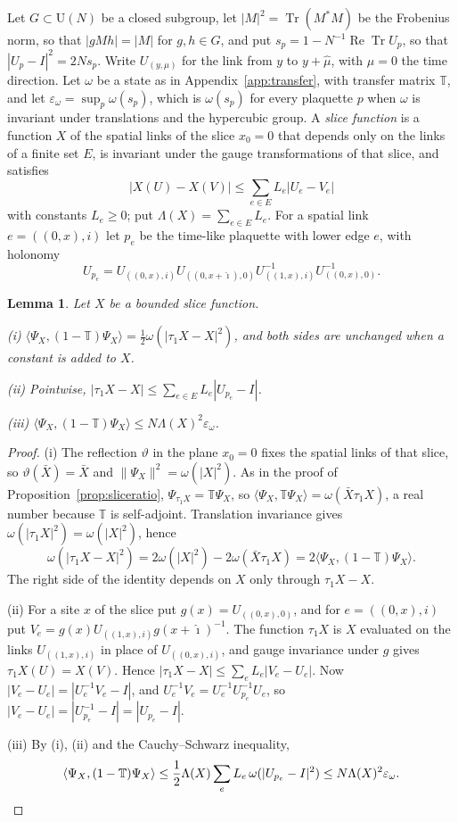 \documentclass[aps,prd,twocolumn,superscriptaddress,nofootinbib,longbibliography,floatfix,amsmath,amssymb,10pt]{revtex4-2}
\newtheorem{lemma}[theorem]{Lemma}
\theoremstyle{definition}
\theoremstyle{remark}
\newcommand{\Tr}{\operatorname{Tr}}
\newcommand{\ReTr}{\operatorname{Re}\operatorname{Tr}}
\newcommand{\ip}[2]{\langle #1,#2\rangle}
\begin{document}
Let $G\subset\mathrm U(N)$ be a closed subgroup, let $|M|^2=\Tr(M^*M)$ be the
Frobenius norm, so that $|gMh|=|M|$ for $g,h\in G$, and put $s_p=1-N^{-1}
\ReTr U_p$, so that $|U_p-I|^2=2Ns_p$. Write $U_{(y,\mu)}$ for the link from
$y$ to $y+\hat\mu$, with $\mu=0$ the time direction. Let $\omega$ be a state
as in Appendix~\ref{app:transfer}, with transfer matrix $\mathbb T$, and let
$\varepsilon_\omega=\sup_p\omega(s_p)$, which is $\omega(s_p)$ for every
plaquette $p$ when $\omega$ is invariant under translations and the
hypercubic group. A \emph{slice function} is a function
$X$ of the spatial links of the slice $x_0=0$ that depends only on the links
of a finite set $E$, is invariant under the gauge transformations of that
slice, and satisfies
\[
|X(U)-X(V)|\le\sum_{e\in E}L_e|U_e-V_e|
\]
with constants $L_e\ge0$; put $\Lambda(X)=\sum_{e\in E}L_e$. For a spatial link
$e=((0,x),i)$ let $p_e$ be the time-like plaquette with lower edge $e$, with
holonomy
\[
U_{p_e}=U_{((0,x),i)}U_{((0,x+\hat\imath),0)}U_{((1,x),i)}^{-1}
U_{((0,x),0)}^{-1}.
\]

\begin{lemma}\label{lem:slabdirichlet}
Let $X$ be a bounded slice function.

\textup{(i)} $\ip{\Psi_X}{(1-\mathbb T)\Psi_X}=\frac12\omega(|\tau_1X-X|^2)$,
and both sides are unchanged when a constant is added to $X$.

\textup{(ii)} Pointwise, $|\tau_1X-X|\le\sum_{e\in E}L_e|U_{p_e}-I|$.

\textup{(iii)} $\ip{\Psi_X}{(1-\mathbb T)\Psi_X}\le N\Lambda(X)^2
\varepsilon_\omega$.
\end{lemma}

\begin{proof}
(i) The reflection $\vartheta$ in the plane $x_0=0$ fixes the spatial links
of that slice, so $\vartheta(\bar X)=\bar X$ and $\|\Psi_X\|^2=\omega(|X|^2)$.
As in the proof of Proposition~\ref{prop:sliceratio}, $\Psi_{\tau_1X}=
\mathbb T\Psi_X$, so $\ip{\Psi_X}{\mathbb T\Psi_X}=\omega(\bar X\tau_1X)$, a
real number because $\mathbb T$ is self-adjoint. Translation invariance gives
$\omega(|\tau_1X|^2)=\omega(|X|^2)$, hence
\[
\omega(|\tau_1X-X|^2)=2\omega(|X|^2)-2\omega(\bar X\tau_1X)=
2\ip{\Psi_X}{(1-\mathbb T)\Psi_X} .
\]
The right side of the identity depends on $X$ only through $\tau_1X-X$.

(ii) For a site $x$ of the slice put $g(x)=U_{((0,x),0)}$, and for
$e=((0,x),i)$ put $V_e=g(x)U_{((1,x),i)}g(x+\hat\imath)^{-1}$. The function
$\tau_1X$ is $X$ evaluated on the links $U_{((1,x),i)}$ in place of
$U_{((0,x),i)}$, and gauge invariance under $g$ gives $\tau_1X(U)=X(V)$.
Hence $|\tau_1X-X|\le\sum_eL_e|V_e-U_e|$. Now $|V_e-U_e|=|U_e^{-1}V_e-I|$,
and $U_e^{-1}V_e=U_e^{-1}U_{p_e}^{-1}U_e$, so $|V_e-U_e|=|U_{p_e}^{-1}-I|=
|U_{p_e}-I|$.

(iii) By (i), (ii) and the Cauchy--Schwarz inequality,
\[
\ip{\Psi_X}{(1-\mathbb T)\Psi_X}\le\frac12\Lambda(X)\sum_eL_e\,\omega
(|U_{p_e}-I|^2)\le N\Lambda(X)^2\varepsilon_\omega . \qedhere
\]
\end{proof}
\end{document}
